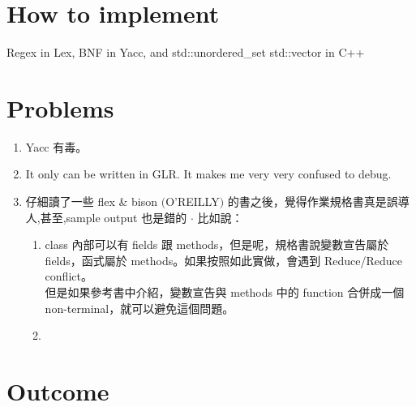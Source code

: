 \documentclass[12pt,a4paper]{article}
\begin{document}
\begin{CJK}{UTF8}{bsmi}
    \section{How to implement}
    Regex in Lex, BNF in Yacc, and std::unordered\_set std::vector in C++

    \section{Problems}
    \begin{enumerate}
        \item Yacc 有毒。
        \item It only can be written in GLR. It makes me very very confused to debug.
        \item 仔細讀了一些 flex \& bison $($O'REILLY$)$ 的書之後，覺得作業規格書真是誤導人,甚至,sample output 也是錯的 $\cdot$
              比如說：\begin{enumerate}
                  \item class 內部可以有 fields 跟 methods，但是呢，規格書說變數宣告屬於 fields，函式屬於 methods。如果按照如此實做，會遇到 Reduce/Reduce conflict。\\
                        但是如果參考書中介紹，變數宣告與 methods 中的 function 合併成一個 non-terminal，就可以避免這個問題。
                  \item
              \end{enumerate}
    \end{enumerate}

    \section{Outcome}
    

\end{CJK}
\end{document}
